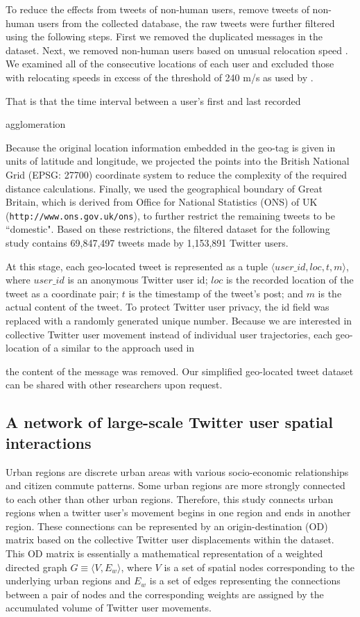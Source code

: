 \documentclass[]{tGIS2e}
\begin{document}
{To reduce the effects from tweets of non-human users,  
remove tweets of non-human users from the collected database, the raw tweets were further filtered using the following steps.
First we removed the duplicated messages in the dataset.
Next, we removed non-human users based on unusual relocation speed \citep{hawelka,jurdak2015}. 
We examined all of the consecutive locations of each user and excluded those with relocating speeds in excess of the threshold of 240 m/s as used by \citep{jurdak2015}. 

That is that the time interval between a user's first and last recorded 

 agglomeration





Because the original location information embedded in the geo-tag is given in units of latitude and longitude, we projected the points into the British National Grid (EPSG: 27700) coordinate system to reduce the complexity of the required distance calculations. 
Finally, we used the geographical boundary of Great Britain, which is derived from Office for National Statistics (ONS) of UK ({\tt{http://www.ons.gov.uk/ons}}), to further restrict the remaining tweets to be ``domestic".
Based on these restrictions, the filtered dataset for the following study contains 69,847,497 tweets made by 1,153,891 Twitter users.

At this stage, each geo-located tweet is represented as a tuple $\langle user\_id, loc, t, m \rangle$, where $user\_id$ is an anonymous Twitter user id; $loc$ is the recorded location of the tweet as a coordinate pair; $t$ is the timestamp of the tweet's post; and $m$ is the actual content of the tweet. 
To protect Twitter user privacy, the id field was replaced with a randomly generated unique number. 
Because we are interested in collective Twitter user movement instead of individual user trajectories,
each geo-location of a
similar to the approach used in

the content of the message was removed. 
Our simplified geo-located tweet dataset can be shared with other researchers upon request.

\subsection{A network of large-scale Twitter user spatial interactions}
Urban regions are discrete urban areas with various socio-economic relationships and citizen commute patterns. 
Some urban regions are more strongly connected to each other than other urban regions.
Therefore, this study connects urban regions when a twitter user's movement begins in one region and ends in another region.
These connections can be represented by an origin-destination (OD) matrix based on the collective Twitter user displacements within the dataset.
This OD matrix is essentially a mathematical representation of a weighted directed graph $G\equiv\langle V, E_{w}\rangle$, where $V$ is a set of spatial nodes corresponding to the underlying urban regions and $E_{w}$ is a set of edges representing the connections between a pair of nodes and the corresponding weights are assigned by the accumulated volume of Twitter user movements.

}
\end{document}
